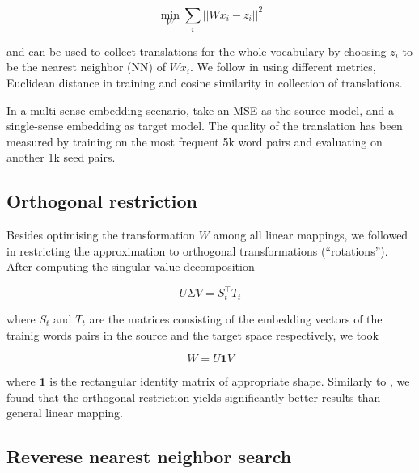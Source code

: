 \documentclass[11pt]{article}
\begin{document}
\[\min_W \sum_i || Wx_i - z_i ||^2 \]

\noindent and can be used to collect translations for the whole vocabulary by
choosing $z_i$ to be the nearest neighbor (NN) of $Wx_i$.
We follow \cite{Mikolov:2013x} in using different metrics, Euclidean
 distance in training and cosine similarity in collection of translations.

In a multi-sense embedding scenario, \cite{Borbely:2016} take an MSE as the
source model, and a single-sense embedding as target model.  The quality of the
translation has been measured by training on the most frequent 5k word pairs
and evaluating on another 1k seed pairs.

\subsection{Orthogonal restriction}

Besides optimising the transformation $W$ among all linear mappings, we
followed \cite{Xing:2015} in restricting the approximation to orthogonal
transformations (``rotations''). After computing the singular value
decomposition

\[U\Sigma V=S_t^\top T_t\]

\noindent where $S_t$ and $T_t$ are the matrices consisting of the embedding vectors of
the trainig words pairs in the source and the target space respectively, we
took

\[W=U\mathbf{1}V\]

\noindent where $\mathbf 1$ is the rectangular identity matrix of appropriate shape.
Similarly to \cite{Xing:2015}, we found that the orthogonal restriction yields
significantly better results than general linear mapping.

\subsection{Reverese nearest neighbor search}



\end{document}
